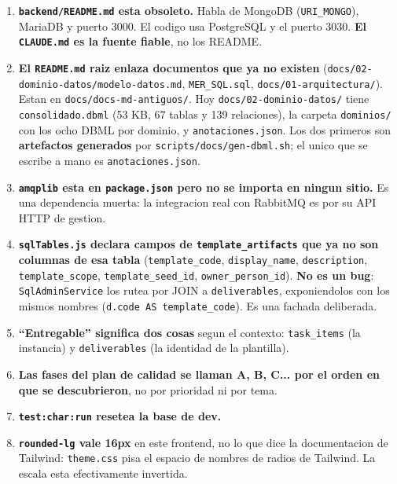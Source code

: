 \documentclass[11pt,a4paper,oneside]{report}
\newcommand{\rt}[1]{\texttt{#1}}
\begin{document}
\begin{enumerate}[leftmargin=1.8em,itemsep=6pt]
  \item \textbf{\rt{backend/README.md} esta obsoleto.} Habla de MongoDB (\rt{URI\_MONGO}),
        MariaDB y puerto 3000. El codigo usa PostgreSQL y el puerto 3030.
        \textbf{El \rt{CLAUDE.md} es la fuente fiable}, no los README.

  \item \textbf{El \rt{README.md} raiz enlaza documentos que ya no existen}
        (\rt{docs/02-dominio-datos/modelo-datos.md}, \rt{MER\_SQL.sql},
        \rt{docs/01-arquitectura/}). Estan en \rt{docs/docs-md-antiguos/}. Hoy \rt{docs/02-dominio-datos/}
        tiene \rt{consolidado.dbml} (53 KB, 67 tablas y 139 relaciones), la carpeta
        \rt{dominios/} con los ocho DBML por dominio, y \rt{anotaciones.json}. Los dos primeros
        son \textbf{artefactos generados} por \rt{scripts/docs/gen-dbml.sh}; el unico que se
        escribe a mano es \rt{anotaciones.json}.

  \item \textbf{\rt{amqplib} esta en \rt{package.json} pero no se importa en ningun sitio.} Es
        una dependencia muerta: la integracion real con RabbitMQ es por su API HTTP de gestion.

  \item \textbf{\rt{sqlTables.js} declara campos de \rt{template\_artifacts} que ya no son
        columnas de esa tabla} (\rt{template\_code}, \rt{display\_name}, \rt{description},
        \rt{template\_scope}, \rt{template\_seed\_id}, \rt{owner\_person\_id}). \textbf{No es un
        bug}: \rt{SqlAdminService} los rutea por JOIN a \rt{deliverables}, exponiendolos con los
        mismos nombres (\rt{d.code AS template\_code}). Es una fachada deliberada.

  \item \textbf{``Entregable'' significa dos cosas} segun el contexto: \rt{task\_items} (la
        instancia) y \rt{deliverables} (la identidad de la plantilla).

  \item \textbf{Las fases del plan de calidad se llaman A, B, C... por el orden en que se
        descubrieron}, no por prioridad ni por tema.

  \item \textbf{\rt{test:char:run} resetea la base de dev.}

  \item \textbf{\rt{rounded-lg} vale 16px} en este frontend, no lo que dice la documentacion de
        Tailwind: \rt{theme.css} pisa el espacio de nombres de radios de Tailwind. La escala esta
        efectivamente invertida.


\end{enumerate}
\end{document}
